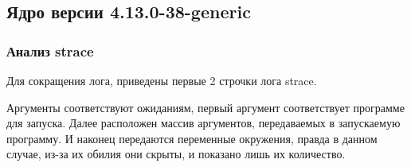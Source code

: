 \subsection{Ядро версии 4.13.0-38-generic}
\subsubsection{Анализ strace}
Для сокращения лога, приведены первые 2 строчки лога strace.

Аргументы соответствуют ожиданиям, первый аргумент соответствует программе для запуска. Далее расположен массив аргументов, передаваемых в запускаемую программу. И наконец передаются переменные окружения, правда в данном случае, из-за их обилия они скрыты, и показано лишь их количество.
